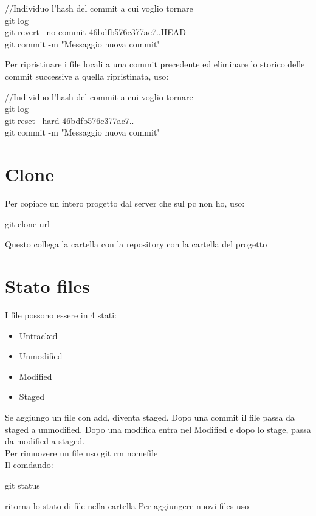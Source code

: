 \begin{tcolorbox}
//Individuo l'hash del commit a cui voglio tornare\\
git log\\
git revert --no-commit 46bdfb576c377ac7..HEAD\\
git commit -m "Messaggio nuova commit"
\end{tcolorbox}

Per ripristinare i file locali a una commit precedente ed eliminare lo storico delle commit successive a quella ripristinata, uso:

\begin{tcolorbox}
//Individuo l'hash del commit a cui voglio tornare\\
git log\\
git reset --hard 46bdfb576c377ac7..\\
git commit -m "Messaggio nuova commit"
\end{tcolorbox}

\section{Clone}
Per copiare un intero progetto dal server che sul pc non ho, uso:

\begin{tcolorbox}
git clone url
\end{tcolorbox}
Questo collega la cartella con la repository con la cartella del progetto
\section{Stato files}
I file possono essere in 4 stati:
\begin{itemize}
\item Untracked
\item Unmodified
\item Modified
\item Staged
\end{itemize}
Se aggiungo un file con add, diventa staged. Dopo una commit il file passa da staged a unmodified. Dopo una modifica entra nel Modified e dopo lo stage, passa da modified a staged.\\
Per rimuovere un file uso git rm nomefile\\
Il comdando:
\begin{tcolorbox}
git status
\end{tcolorbox}
ritorna lo stato di file nella cartella
Per aggiungere nuovi files uso 

